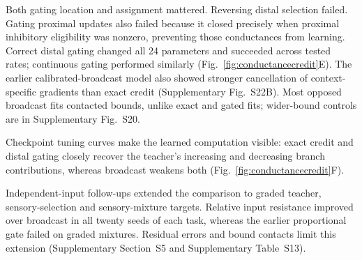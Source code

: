 \documentclass[11pt]{article}
\begin{document}
Both gating location and assignment mattered. Reversing distal selection failed. Gating proximal updates also failed because it closed precisely when proximal inhibitory eligibility was nonzero, preventing those conductances from learning. Correct distal gating changed all 24 parameters and succeeded across tested rates; continuous gating performed similarly (Fig.~\ref{fig:conductancecredit}E). The earlier calibrated-broadcast model also showed stronger cancellation of context-specific gradients than exact credit (Supplementary Fig.~S22B). Most opposed broadcast fits contacted bounds, unlike exact and gated fits; wider-bound controls are in Supplementary Fig.~S20.

Checkpoint tuning curves make the learned computation visible: exact credit and distal gating closely recover the teacher's increasing and decreasing branch contributions, whereas broadcast weakens both (Fig.~\ref{fig:conductancecredit}F).

Independent-input follow-ups extended the comparison to graded teacher, sensory-selection and sensory-mixture targets. Relative input resistance improved over broadcast in all twenty seeds of each task, whereas the earlier proportional gate failed on graded mixtures. Residual errors and bound contacts limit this extension (Supplementary Section~S5 and Supplementary Table~S13).
\end{document}
